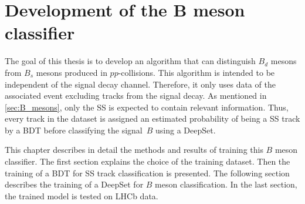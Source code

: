 \chapter[Development of the \texorpdfstring{$B$}{B} meson classifier]{Development of the \texorpdfstring{$\symbf{B}$}{B} meson classifier}

The goal of this thesis is to develop an algorithm that can distinguish $B_d$ mesons from $B_s$ mesons produced in $pp$-collisions.
This algorithm is intended to be independent of the signal decay channel. 
Therefore, it only uses data of the associated event excluding tracks from the signal decay.
As mentioned in \cref{sec:B_mesons}, only the SS is expected to contain relevant information.
Thus, every track in the dataset is assigned an estimated probability of being a SS track by a BDT before classifying the signal~$B$ using a DeepSet.

This chapter describes in detail the methods and results of training this $B$ meson classifier.
The first section explains the choice of the training dataset.
Then the training of a BDT for SS track classification is presented.
The following section describes the training of a DeepSet for $B$ meson classification.
In the last section, the trained model is tested on LHCb data.




